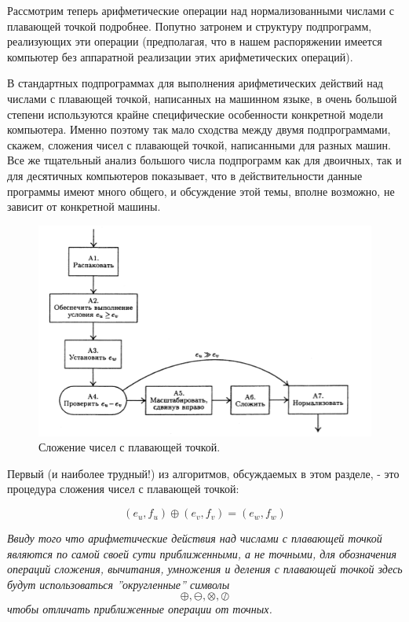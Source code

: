 Рассмотрим теперь арифметические операции над нормализованными числами с плавающей точкой подробнее. Попутно затронем и структуру подпрограмм, реализующих эти операции (предполагая, что в нашем распоряжении имеется компьютер без аппаратной реализации этих арифметических операций).

В стандартных подпрограммах для выполнения арифметических действий над числами с плавающей точкой, написанных на машинном языке, в очень большой степени используются крайне специфические особенности конкретной модели компьютера. Именно поэтому так мало сходства между двумя подпрограммами, скажем, сложения чисел с плавающей точкой, написанными для разных машин. Все же тщательный анализ большого числа подпрограмм как для двоичных, так и для десятичных компьютеров показывает, что в действительности данные программы имеют много общего, и обсуждение этой темы, вполне возможно, не зависит от конкретной машины. 

\begin{figure}

\begin{center}
\includegraphics[scale=.9]{s.png}
\end{center}
\caption{Сложение чисел с плавающей точкой.}
\end{figure}


Первый (и наиболее трудный!) из алгоритмов, обсуждаемых в этом разделе, - это процедура сложения чисел с плавающей точкой:

\begin{equation}
(e_u,f_u) \oplus (e_v,f_v) = (e_w, f_w)
\end{equation}

\textit{Ввиду того что арифметические действия над числами с плавающей точкой являются по самой своей сути приближенными, а не точными, для обозначения операций сложения, вычитания, умножения и деления с плавающей точкой здесь будут использоваться ''округленные'' символы}
$$ \oplus, \ominus, \otimes, \oslash $$
\textit{чтобы отличать приближенные операции от точных.}

